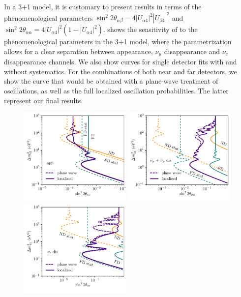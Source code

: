 In a 3+1 model, it is customary to present results in terms of the phenomenological parameters $\sin^2{2 \theta_{\alpha \beta}} = 4 |U_{\alpha 4}|^2|U_{\beta 4}|^2$ and $\sin^2{2 \theta_{\alpha \alpha}} = 4|U_{\alpha 4}|^2(1 - |U_{\alpha 4}|^2)$.  shows the sensitivity of \nus to the phenomenological parameters in the 3+1 model, where the parametrization allows for a clear separation between appearance, $\nu_\mu$ disappearance and $\nu_e$ disappearance channels. We also show curves for single detector fits with and without systematics. For the combinations of both near and far detectors, we show the curve that would be obtained with a plane-wave treatment of oscillations, as well as the full localized oscillation probabilities. The latter represent our final results. 
%
\begin{figure}[t]
\includegraphics[width=0.49\textwidth]{figs/NDFD_Shape_app.pdf}
\includegraphics[width=0.49\textwidth]{figs/NDFD_Shape_dis.pdf}
\includegraphics[width=0.49\textwidth]{figs/NDFD_Shape_edis.pdf}

\end{figure}
